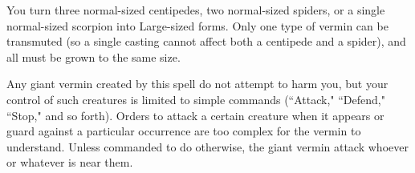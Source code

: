 \begin{comment}
\spellsection{Ghoul Touch}
\spellschool{Necromancy (Flesh)}
\spelllvl{Sor/Wiz 3}
\spellrng{\rngtouch}
\spelltgt{Living creature touched}
\spelldur{\durshort}
\spellsave{None/Fortitude negates}
\spellsr{Yes (Fortitude)}
\begin{spelleffect}
  The subject is sickened, making it vulnerable.
\end{spelleffect}
\begin{spellblood}
  In addition, the subject is paralyzed if it fails a Fortitude save. Each round that it is paralyzed, the subject can make a new saving throw. If it succeeds, it is no longer paralyzed by the spell, though it is still sickened. In addition, as long as it is paralyzed, the subject exudes a carrion stench that causes all living creatures (except you) in a \areasmall radius spread to become sickened (Fortitude negates) for 5 rounds.
\end{spellblood}
\begin{spellnotes}
  A vulnerable creature takes a \minus2 penalty to attack rolls, saving throws, checks, DCs, and AC.
\end{spellnotes}
\end{comment}

\spellrng{\rngclose}
\spelldur{\durmed}
\begin{spelleffect}
  You turn three normal-sized centipedes, two normal-sized spiders, or a single normal-sized scorpion into Large-sized forms. Only one type of vermin can be transmuted (so a single casting cannot affect both a centipede and a spider), and all must be grown to the same size.
  \par Any giant vermin created by this spell do not attempt to harm you, but your control of such creatures is limited to simple commands (``Attack," ``Defend," ``Stop," and so forth). Orders to attack a certain creature when it appears or guard against a particular occurrence are too complex for the vermin to understand. Unless commanded to do otherwise, the giant vermin attack whoever or whatever is near them.
\end{spelleffect}

